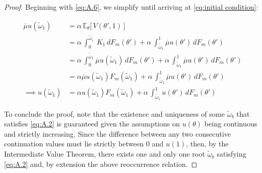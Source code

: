\begin{proof}
Beginning with \ref{eq:A.6}, we simplify until arriving at \autoref{eq:initial condition}:

\begin{equation*} 
    \begin{split}
        \overline\mu u(\widetilde\omega_1) &= \alpha \, \mathbb{E}_\theta\Big[\,V(\theta',1)\,\Big]\\
        &= \alpha \,\int^{\widetilde\omega_1}_0\,K_1\,dF_m(\theta') + \alpha \,\int_{\widetilde\omega_1}^1 \overline\mu u(\theta')\,dF_m(\theta')\\
        &= \alpha \,\int^{\widetilde\omega_1}_0 \overline\mu u(\widetilde\omega_1)\,dF_m(\theta') + \alpha \,\int_{\widetilde\omega_1}^1 \overline\mu u(\theta')\,dF_m(\theta')\\
        &= \alpha \overline\mu u(\widetilde\omega_1)F_m(\widetilde\omega_1) + \alpha \,\int_{\widetilde\omega_1}^1 \overline\mu u(\theta')\,dF_m(\theta')\\
        \implies u(\widetilde\omega_1) &= \alpha u(\widetilde\omega_1)F_m(\widetilde\omega_1) + \alpha \,\int_{\widetilde\omega_1}^1 u(\theta')\,dF_m(\theta') 
    \end{split}
\end{equation*}  

To conclude the proof, note that the existence and uniqueness of some $\widetilde\omega_b$ that satisfies \ref{eq:A.2} is guaranteed given the assumptions on $u(\theta)$ being continuous and strictly increasing. Since the difference between any two consecutive continuation values must lie strictly between 0 and $u(1)$, then, by the Intermediate Value Theorem, there exists one and only one root $\widetilde\omega_b$ satisfying \ref{eq:A.2} and, by extension the above reoccurrence relation. 
\end{proof}